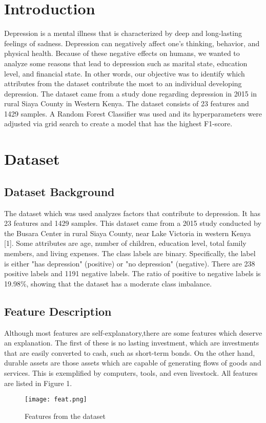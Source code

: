 \documentclass[conference]{IEEEtran}
\begin{document}
\section{Introduction}
Depression is a mental illness that is characterized by deep and long-lasting feelings of sadness. Depression can negatively affect one's thinking, behavior, and physical health. Because of these negative effects on humans, we wanted to analyze some reasons that lead to depression such as marital state, education level, and financial state. In other words, our objective was to identify which attributes from the dataset contribute the most to an individual developing depression. The dataset came from a study done regarding depression in 2015 in rural Siaya County in Western Kenya. The dataset consists of 23 features and 1429 samples. A Random Forest Classifier was used and its hyperparameters were adjusted via grid search to create a model that has the highest F1-score.

\section{Dataset}

\subsection{Dataset Background}
The dataset which was used analyzes factors that contribute to depression. It has 23 features and 1429 samples. This dataset came from a 2015 study conducted by the Busara Center in rural Siaya County, near Lake Victoria in western Kenya [1]. Some attributes are age, number of children, education level, total family members, and living expenses. The class labels are binary. Specifically, the label is either "has depression" (positive) or "no depression" (negative). There are 238 positive labels and 1191 negative labels. The ratio of positive to negative labels is 19.98\%, showing that the dataset has a moderate class imbalance.


\subsection{Feature Description}
Although most features are self-explanatory,there are some features which deserve an explanation. The first of these is no lasting investment, which are investments that are easily converted to cash, such as short-term bonds. On the other hand, durable assets are those assets which are capable of generating flows of goods and services. This is exemplified by computers, tools, and even livestock. All features are listed in Figure 1.
\begin{figure}[hbt!]
\centering
\texttt{[image: feat.png]}
\caption{Features from the dataset\label{overflow}}
\end{figure}
\end{document}
